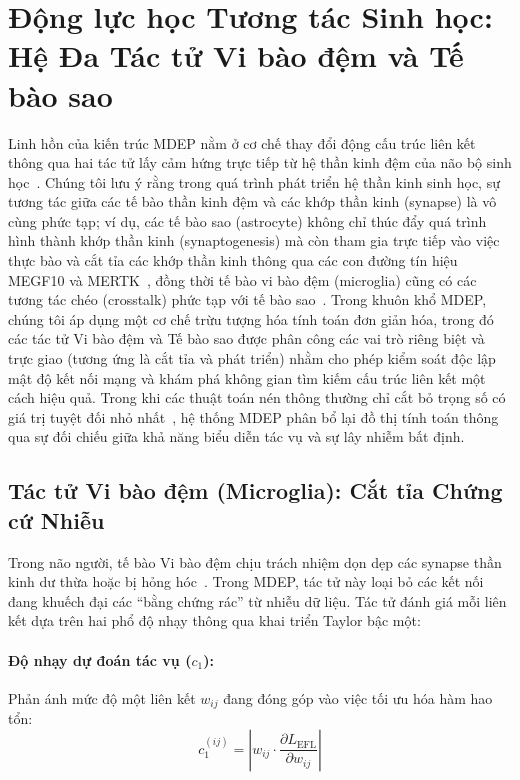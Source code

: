 \documentclass[11pt, a4paper]{article}
\begin{document}
\section{Động lực học Tương tác Sinh học: Hệ Đa Tác tử Vi bào đệm và Tế bào sao}\label{sec:agents}

Linh hồn của kiến trúc MDEP nằm ở cơ chế thay đổi động cấu trúc liên kết thông qua hai tác tử lấy cảm hứng trực tiếp từ hệ thần kinh đệm của não bộ sinh học~\cite{paolicelli2011synaptic, schafer2012microglia}. Chúng tôi lưu ý rằng trong quá trình phát triển hệ thần kinh sinh học, sự tương tác giữa các tế bào thần kinh đệm và các khớp thần kinh (synapse) là vô cùng phức tạp; ví dụ, các tế bào sao (astrocyte) không chỉ thúc đẩy quá trình hình thành khớp thần kinh (synaptogenesis) mà còn tham gia trực tiếp vào việc thực bào và cắt tỉa các khớp thần kinh thông qua các con đường tín hiệu MEGF10 và MERTK~\cite{chung2013astrocytes}, đồng thời tế bào vi bào đệm (microglia) cũng có các tương tác chéo (crosstalk) phức tạp với tế bào sao~\cite{vainchtein2018astrocyte}. Trong khuôn khổ MDEP, chúng tôi áp dụng một cơ chế trừu tượng hóa tính toán đơn giản hóa, trong đó các tác tử Vi bào đệm và Tế bào sao được phân công các vai trò riêng biệt và trực giao (tương ứng là cắt tỉa và phát triển) nhằm cho phép kiểm soát độc lập mật độ kết nối mạng và khám phá không gian tìm kiếm cấu trúc liên kết một cách hiệu quả. Trong khi các thuật toán nén thông thường chỉ cắt bỏ trọng số có giá trị tuyệt đối nhỏ nhất~\cite{han2016deep}, hệ thống MDEP phân bổ lại đồ thị tính toán thông qua sự đối chiếu giữa khả năng biểu diễn tác vụ và sự lây nhiễm bất định.

\subsection{Tác tử Vi bào đệm (Microglia): Cắt tỉa Chứng cứ Nhiễu}\label{subsec:microglia}

Trong não người, tế bào Vi bào đệm chịu trách nhiệm dọn dẹp các synapse thần kinh dư thừa hoặc bị hỏng hóc~\cite{paolicelli2011synaptic, schafer2012microglia}. Trong MDEP, tác tử này loại bỏ các kết nối đang khuếch đại các ``bằng chứng rác'' từ nhiễu dữ liệu. Tác tử đánh giá mỗi liên kết dựa trên hai phổ độ nhạy thông qua khai triển Taylor bậc một:

\paragraph{Độ nhạy dự đoán tác vụ ($c_1$):}
Phản ánh mức độ một liên kết $w_{ij}$ đang đóng góp vào việc tối ưu hóa hàm hao tổn:
\begin{equation}
    c_1^{(ij)} = \left| w_{ij} \cdot \frac{\partial L_{\text{EFL}}}{\partial w_{ij}} \right|
\end{equation}
\end{document}
